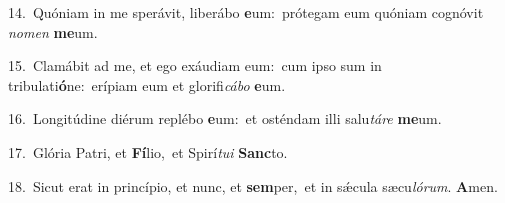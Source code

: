 {\numbfont\textcolor{\numbcolor}{14.}}~Quóniam in me sperávit, liberábo \textbf{e}\-um:~\star prótegam eum quóniam cognóvit \textit{no}\-\textit{men} \textbf{me}\-um.\par
{\numbfont\textcolor{\numbcolor}{15.}}~Clamábit ad me, et ego exáudiam eum:~\dagger cum ipso sum in tribulati\-\textbf{ó}\-ne:~\star erípiam eum et glorifi\-\textit{cá}\-\textit{bo} \textbf{e}\-um.\par
{\numbfont\textcolor{\numbcolor}{16.}}~Longitúdine diérum replébo \textbf{e}\-um:~\star et osténdam illi salu\-\textit{tá}\-\textit{re} \textbf{me}\-um.\par
{\numbfont\textcolor{\numbcolor}{17.}}~Glória Patri, et \textbf{Fí}\-lio,~\star et Spirí\-\textit{tu}\-\textit{i} \textbf{Sanc}\-to.\par
{\numbfont\textcolor{\numbcolor}{18.}}~Sicut erat in princípio, et nunc, et \textbf{sem}\-per,~\star et in sǽcula sæcu\-\textit{ló}\-\textit{rum}. \textbf{A}\-men.\par
